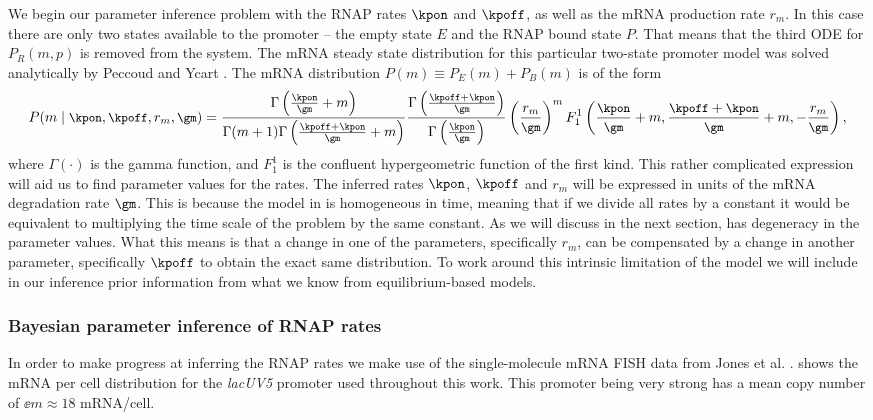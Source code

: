 We begin our parameter inference problem with the RNAP rates $\kpon$ and
$\kpoff$, as well as the mRNA production rate $r_m$. In this case there are only
two states available to the promoter -- the empty state $E$ and the RNAP bound
state $P$. That means that the third ODE for $P_R(m, p)$ is removed from the
system. The mRNA steady state distribution for this particular two-state
promoter model was solved analytically by Peccoud and Ycart \cite{Peccoud1995}.
The mRNA distribution $P(m) \equiv P_E(m) + P_B(m)$ is of the form
\begin{equation}
  \small
  P(m \mid \kpon, \kpoff, r_m, \gm) =
  {\Gamma \left( \frac{\kpon}{\gm} + m \right) \over
  \Gamma(m + 1) \Gamma\left( \frac{\kpoff+\kpon}{\gm} + m \right)}
  {\Gamma\left( \frac{\kpoff+\kpon}{\gm} \right) \over
  \Gamma\left( \frac{\kpon}{\gm} \right)}
  \left( {r_m \over \gm} \right)^m
  F_1^1 \left( {\kpon \over \gm} + m,
  {\kpoff + \kpon \over \gm} + m,
  -{r_m \over \gm} \right),
  \label{seq_two_state_mRNA}
\end{equation}
where $\Gamma(\cdot)$ is the gamma function, and $F_1^1$ is the confluent
hypergeometric function of the first kind. This rather complicated expression
will aid us to find parameter values for the rates. The inferred rates $\kpon$,
$\kpoff$ and $r_m$ will be expressed in units of the mRNA degradation rate
$\gm$. This is because the model in  is homogeneous in
time, meaning that if we divide all rates by a constant it would be equivalent
to multiplying the time scale of the problem by the same constant. As we will
discuss in the next section,  has degeneracy in the
parameter values. What this means is that a change in one of the parameters,
specifically $r_m$, can be compensated by a change in another parameter,
specifically $\kpoff$ to obtain the exact same distribution. To work around this
intrinsic limitation of the model we will include in our inference prior
information from what we know from equilibrium-based models.

\subsubsection*{Bayesian parameter inference of RNAP rates}

In order to make progress at inferring the RNAP rates we make use of the
single-molecule mRNA FISH data from Jones et al. \cite{Jones2014a}.
 shows the mRNA per cell distribution for the
\textit{lacUV5} promoter used throughout this work. This promoter being very
strong has a mean copy number of $\ee{m} \approx 18$ mRNA/cell.

